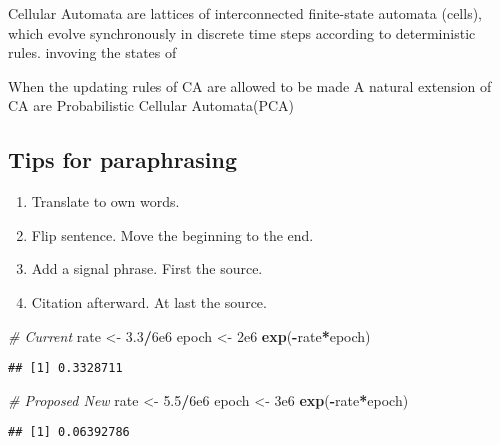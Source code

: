 \documentclass[
]{book}
\newenvironment{Shaded}{\begin{snugshade}}{\end{snugshade}}
\newcommand{\CommentTok}[1]{\textcolor[rgb]{0.56,0.35,0.01}{\textit{#1}}}
\newcommand{\FloatTok}[1]{\textcolor[rgb]{0.00,0.00,0.81}{#1}}
\newcommand{\KeywordTok}[1]{\textcolor[rgb]{0.13,0.29,0.53}{\textbf{#1}}}
\newcommand{\NormalTok}[1]{#1}
\newcommand{\OperatorTok}[1]{\textcolor[rgb]{0.81,0.36,0.00}{\textbf{#1}}}
\newcommand{\StringTok}[1]{\textcolor[rgb]{0.31,0.60,0.02}{#1}}
\providecommand{\tightlist}{%
  \setlength{\itemsep}{0pt}\setlength{\parskip}{0pt}}
\begin{document}
Cellular Automata are lattices of interconnected finite-state
automata (cells), which evolve synchronously in discrete time
steps according to deterministic rules.
invoving the states of

When the updating rules of CA are allowed to be made
A natural extension of CA are Probabilistic Cellular Automata(PCA)

\hypertarget{tips-for-paraphrasing}{%
\subsection{Tips for paraphrasing}\label{tips-for-paraphrasing}}

\begin{enumerate}
\def\labelenumi{\arabic{enumi}.}
\tightlist
\item
  Translate to own words.
\item
  Flip sentence. Move the beginning to the end.
\item
  Add a signal phrase. First the source.
\item
  Citation afterward. At last the source.
\end{enumerate}

\begin{Shaded}
\begin{Highlighting}[]
\CommentTok{\# Current}
\NormalTok{rate \textless{}{-}}\StringTok{ }\FloatTok{3.3}\OperatorTok{/}\FloatTok{6e6}
\NormalTok{epoch \textless{}{-}}\StringTok{ }\FloatTok{2e6}
\KeywordTok{exp}\NormalTok{(}\OperatorTok{{-}}\NormalTok{rate}\OperatorTok{*}\NormalTok{epoch)}
\end{Highlighting}
\end{Shaded}

\begin{verbatim}
## [1] 0.3328711
\end{verbatim}

\begin{Shaded}
\begin{Highlighting}[]
\CommentTok{\# Proposed New}
\NormalTok{rate \textless{}{-}}\StringTok{ }\FloatTok{5.5}\OperatorTok{/}\FloatTok{6e6}
\NormalTok{epoch \textless{}{-}}\StringTok{ }\FloatTok{3e6}
\KeywordTok{exp}\NormalTok{(}\OperatorTok{{-}}\NormalTok{rate}\OperatorTok{*}\NormalTok{epoch)}
\end{Highlighting}
\end{Shaded}

\begin{verbatim}
## [1] 0.06392786
\end{verbatim}
\end{document}
